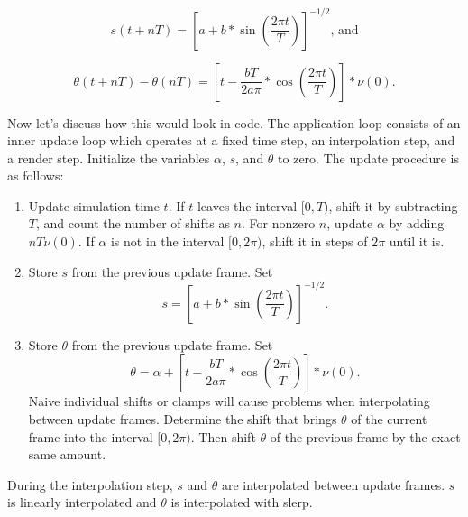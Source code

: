 \documentclass[a4paper,12pt]{book}
\begin{document}
\begin{equation*}
s(t + n T) = \left[ a + b * \sin\left(\frac{2 \pi t}{T}\right) \right]^{-1/2}\text{, and}
\end{equation*}

\begin{equation*}
\theta(t + n T) - \theta(n T) = \left[t - \frac{b T}{2 a \pi} * \cos\left(\frac{2 \pi t}{T}\right) \right] * \nu(0).
\end{equation*}


Now let's discuss how this would look in code. The application loop consists of an inner update loop which operates at a fixed time step, an interpolation step, and a render step.
Initialize the variables $\alpha$, $s$, and $\theta$ to zero. The update procedure is as follows:

\begin{enumerate}
\item Update simulation time $t$.
If $t$ leaves the interval $[0, T)$, shift it by subtracting $T$, and count the number of shifts as $n$. For nonzero $n$, update $\alpha$ by adding $n T \nu(0)$. If $\alpha$ is not in the interval $[0, 2 \pi)$, shift it in steps of $2 \pi$ until it is.
\item Store $s$ from the previous update frame. Set 
\[ s = \left[ a + b * \sin\left(\frac{2 \pi t}{T}\right) \right]^{-1/2}. \]
\item Store $\theta$ from the previous update frame. Set 
\[ \theta = \alpha + \left[t - \frac{b T}{2 a \pi} * \cos\left(\frac{2 \pi t}{T}\right) \right] * \nu(0). \]
Naive individual shifts or clamps will cause problems when interpolating between update frames. Determine the shift that brings $\theta$ of the current frame into the interval $[0, 2 \pi)$. Then shift $\theta$ of the previous frame by the exact same amount.
\end{enumerate}

During the interpolation step, $s$ and $\theta$ are interpolated between update frames. $s$ is linearly interpolated and $\theta$ is interpolated with slerp.

\chapter*{}
\end{document}
